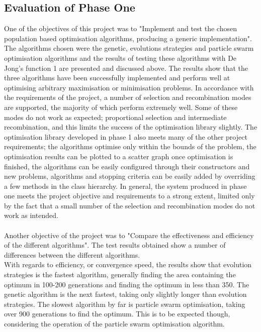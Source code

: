 \subsection{Evaluation of Phase One}
One of the objectives of this project was to "Implement and test the chosen population based optimisation algorithms, producing a generic implementation". The algorithms chosen were the genetic, evolutions strategies and particle swarm optimisation algorithms and the results of testing these algorithms with De Jong's function 1 are presented and discussed above. The results show that the three algorithms have been successfully implemented and perform well at optimising arbitrary maximisation or minimisation problems. In accordance with the requirements of the project, a number of selection and recombination modes are supported, the majority of which perform extremely well. Some of these modes do not work as expected; proportional selection and intermediate recombination, and this limits the success of the optimisation library slightly. The optimisation library developed in phase 1 also meets many of the other project requirements; the algorithms optimise only within the bounds of the problem, the optimisation results can be plotted to a scatter graph once optimisation is finished, the algorithms can be easily configured through their constructors and new problems, algorithms and stopping criteria can be easily added by overriding a few methods in the class hierarchy. In general, the system produced in phase one meets the project objective and requirements to a strong extent, limited only by the fact that a small number of the selection and recombination modes do not work as intended.
\\\\Another objective of the project was to "Compare the effectiveness and efficiency of the different algorithms". The test results obtained show a number of differences between the different algorithms. 
\\With regards to efficiency, or convergence speed, the results show that evolution strategies is the fastest algorithm, generally finding the area containing the optimum in 100-200 generations and finding the optimum in less than 350. The genetic algorithm is the next fastest, taking only slightly longer than evolution strategies. The slowest algorithm by far is particle swarm optimisation, taking over 900 generations to find the optimum. This is to be expected though, considering the operation of the particle swarm optimisation algorithm. 
